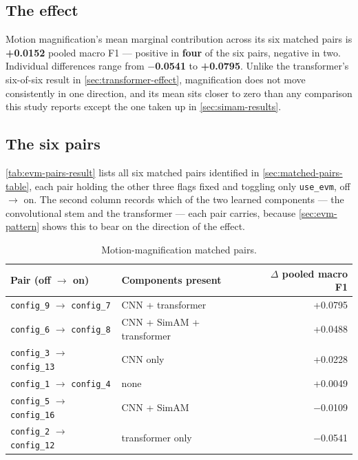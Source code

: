 \subsection{The effect}
\label{sec:evm-effect-result}

Motion magnification's mean marginal contribution across its six matched pairs is \textbf{+0.0152} pooled macro F1 --- positive in \textbf{four} of the six pairs, negative in two. Individual differences range from \textbf{$-$0.0541} to \textbf{+0.0795}. Unlike the transformer's six-of-six result in \autoref{sec:transformer-effect}, magnification does not move consistently in one direction, and its mean sits closer to zero than any comparison this study reports except the one taken up in \autoref{sec:simam-results}.

\subsection{The six pairs}
\label{sec:evm-six-pairs}

\autoref{tab:evm-pairs-result} lists all six matched pairs identified in \autoref{sec:matched-pairs-table}, each pair holding the other three flags fixed and toggling only \texttt{use\_evm}, off $\rightarrow$ on. The second column records which of the two learned components --- the convolutional stem and the transformer --- each pair carries, because \autoref{sec:evm-pattern} shows this to bear on the direction of the effect.

\begin{table}[htbp]
	\centering
	\begin{tabular}{l l r}
		\hline
		\textbf{Pair (off $\rightarrow$ on)} & \textbf{Components present} & \textbf{$\Delta$ pooled macro F1} \\
		\hline
		\texttt{config\_9} $\rightarrow$ \texttt{config\_7}  & CNN + transformer         & +0.0795 \\
		\texttt{config\_6} $\rightarrow$ \texttt{config\_8}  & CNN + SimAM + transformer & +0.0488 \\
		\texttt{config\_3} $\rightarrow$ \texttt{config\_13} & CNN only                  & +0.0228 \\
		\texttt{config\_1} $\rightarrow$ \texttt{config\_4}  & none                      & +0.0049 \\
		\texttt{config\_5} $\rightarrow$ \texttt{config\_16} & CNN + SimAM               & $-$0.0109 \\
		\texttt{config\_2} $\rightarrow$ \texttt{config\_12} & transformer only          & $-$0.0541 \\
		\hline
	\end{tabular}
	\caption[Motion-magnification matched pairs]{Motion-magnification matched pairs.}
	\label{tab:evm-pairs-result}
\end{table}

